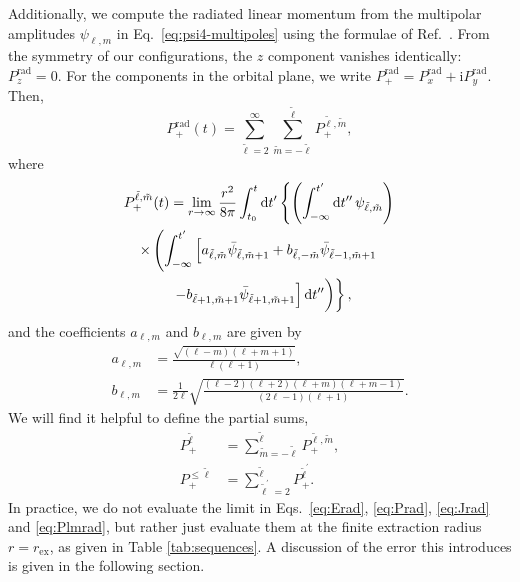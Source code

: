 \documentclass[floats,floatfix,showpacs,amssymb,physrev,twocolumn,superscriptaddress,reprint,
nofootinbib, longbibliography]{revtex4-2}
\newcommand{\rad}{\mathrm{rad}}
\newcommand{\tl}{\tilde{\ell}}
\newcommand{\tm}{\tilde{m}}
\newcommand{\rmd}{\mathrm{d}}
\begin{document}
Additionally, we compute the radiated linear momentum from the multipolar
amplitudes $\psi_{\ell, m}$ in Eq.~\eqref{eq:psi4-multipoles} using the 
formulae of Ref.~\cite{Ruiz:2007yx}. From the symmetry of our 
configurations, the $z$ component vanishes identically: $P_z^{\rad}=0$.
For the components in the orbital plane, we write
$P_+^{\rad}=P_x^{\rad}+\mathrm{i}P_y^{\rad}$. Then,
\begin{equation}
     P_+^{\rad}(t) = \sum_{\tl=2}^{\infty}
     \sum_{\tm=-\tl}^{\tl}P_+^{\tl,\tm},
     \label{eq:P+rad}
\end{equation}
where
\begin{multline}
    P_+^{\tl,\tm}(t) = \lim_{r\rightarrow \infty}
    \frac{r^2}{8\pi}\int_{t_0}^t\rmd t^{\prime}
    \left\{\left(\int^{t^\prime}_{-\infty}\rmd t^{\prime\prime}\, 
    \psi_{\tl,\tm}\right)\right. \\
    \times\left(\int_{-\infty}^{t^\prime} 
    \left[a_{\tl,\tm}\bar{\psi}_{\tl,\tm+1}+ 
    b_{\tl,-\tm}\bar{\psi}_{\tl-1,\tm+1}\right. \right.\\
    \left.\left.\vphantom{\int_{-\infty}^t}\left.-
    b_{\tl+1,\tm+1}\bar{\psi}_{\tl+1,\tm+1}\right]
    \rmd t^{\prime\prime}\right)\right\},
    \label{eq:Plmrad}
\end{multline}
and the coefficients $a_{\ell,m}$ and $b_{\ell,m}$ are given by
%
\begin{align}
    a_{\ell, m} &= \frac{\sqrt{\left(\ell - m\right)\left(\ell +
    m+1\right)}}{\ell\left(\ell + 1\right)},\\
    b_{\ell, m} &= \frac{1}{2\ell}\sqrt{\frac{\left(\ell - 2\right) 
    \left(\ell + 2\right) \left(\ell + m\right) \left(\ell + m - 
    1\right)}{\left(2\ell - 1\right)\left(\ell + 1\right)}}.
\end{align}
%
We will find it helpful to define the partial sums,
%
\begin{align}
    P_+^{\tl} &= \sum_{\tm = -\tl}^{\tl} P_+^{\tl,\tm},\\
    P_+^{\leq\tl} &= \sum_{\tl^\prime=2}^{\tl} P_+^{\tl^\prime}. 
    \label{eq:partialkick}
\end{align}
%
In practice, we do not evaluate the limit in Eqs.~\eqref{eq:Erad}, 
\eqref{eq:Prad}, \eqref{eq:Jrad} and \eqref{eq:Plmrad}, but rather just 
evaluate them at the finite extraction radius $r=r_{\mathrm{ex}}$, as given 
in Table \ref{tab:sequences}. A discussion of the error this introduces is 
given in the following section.
\end{document}
